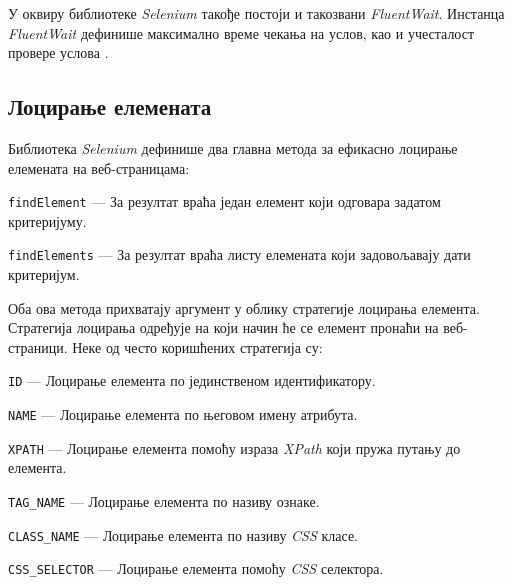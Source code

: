 \documentclass[12pt,oneside]{memoir}
\begin{document}
У оквиру библиотеке \textit{Selenium} такође постоји и такозвани \textit{FluentWait}. Инстанца \textit{FluentWait} дефинише максимално време чекања на услов, као и учесталост провере услова \cite{selenium}.

\subsection{Лоцирање елемената}
Библиотека \textit{Selenium} дефинише два главна метода за ефикасно лоцирање елемената на веб-страницама:
\begin{description} 
    \item \texttt{findElement} --- За резултат враћа један елемент који одговара задатом критеријуму.
    \item \texttt{findElements} --- За резултат враћа листу елемената који задовољавају дати критеријум.
\end{description}

Оба ова метода прихватају аргумент у облику стратегије лоцирања елемента. Стратегија лоцирања одређује на који начин ће се елемент пронаћи на веб-страници. Неке од често коришћених стратегија су: 
\begin{description} 
    \item \texttt{ID} --- Лоцирање елемента по јединственом идентификатору.
    \item \texttt{NAME} --- Лоцирање елемента по његовом имену атрибута.
    \item \texttt{XPATH} --- Лоцирање елемента помоћу израза \textit{XPath} који пружа путању до елемента.
    \item \texttt{TAG\_NAME} --- Лоцирање елемента по називу ознаке.
    \item \texttt{CLASS\_NAME} --- Лоцирање елемента по називу \textit{CSS} класе.
    \item \texttt{CSS\_SELECTOR} --- Лоцирање елемента помоћу \textit{CSS} селектора.
\end{description}
\end{document}
